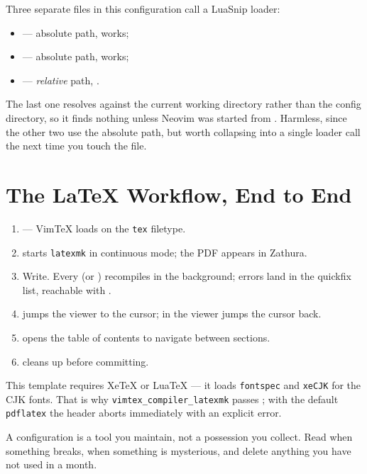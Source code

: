 \begin{remark}
	Three separate files in this configuration call a LuaSnip loader:
	\begin{itemize}[nosep, leftmargin=*]
		\item {} --- absolute path, works;
		\item {} --- absolute path, works;
		\item {} --- \emph{relative} path,
		      .
	\end{itemize}
	The last one resolves against the current working directory rather than the
	config directory, so it finds nothing unless Neovim was started from
	. Harmless, since the other two use the
	absolute path, but worth collapsing into a single loader call the next time you
	touch the file.
\end{remark}

\section{The \texorpdfstring{\LaTeX{}}{LaTeX} Workflow, End to End}\label{sec:setup-workflow}

\begin{enumerate}[(1)]
	\item {} --- VimTeX loads on the \texttt{tex} filetype.
	\item \key{\textbackslash}   starts \texttt{latexmk} in continuous
	      mode; the PDF appears in Zathura.
	\item Write. Every  (or ) recompiles in the background;
	      errors land in the quickfix list, reachable with \key{]} .
	\item \key{\textbackslash}   jumps the viewer to the cursor;
	       in the viewer jumps the cursor back.
	\item \key{\textbackslash}   opens the table of contents to
	      navigate between sections.
	\item \key{\textbackslash}   cleans up before committing.
\end{enumerate}

\begin{note}
	This template requires XeTeX or LuaTeX --- it loads \texttt{fontspec} and
	\texttt{xeCJK} for the CJK fonts. That is why \texttt{vimtex\_compiler\_latexmk}
	passes ; with the default \texttt{pdflatex} the header aborts
	immediately with an explicit error.
\end{note}

\begin{moral}
	A configuration is a tool you maintain, not a possession you collect. Read
	 when something breaks,  when something is
	mysterious, and delete anything you have not used in a month.
\end{moral}

